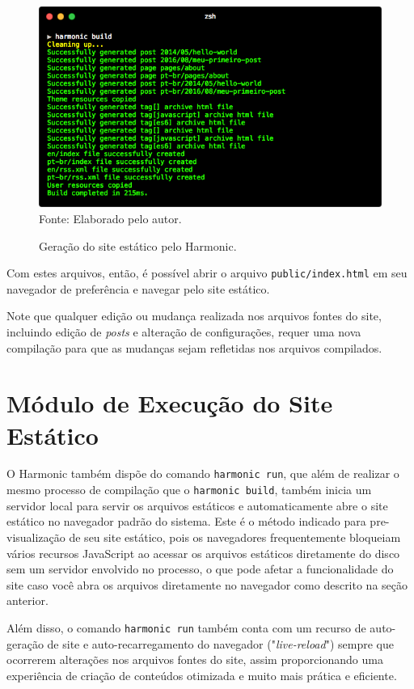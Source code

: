 \documentclass[ppginf, pep]{esinucpel}
\newcommand{\code}[1]{\texttt{#1}}
\begin{document}
\begin{figure}[htbp]
    \centering
    \caption{Geração do site estático pelo Harmonic.}
    \vspace{5pt}
    \includegraphics[width=\textwidth]{harmonic_build}
    \\Fonte: Elaborado pelo autor.
    \label{fig:comando_harmonic_build}
\end{figure}

Com estes arquivos, então, é possível abrir o arquivo \code{public/index.html} em seu navegador de preferência e navegar pelo site estático.

Note que qualquer edição ou mudança realizada nos arquivos fontes do site, incluindo edição de \textit{posts} e alteração de configurações, requer uma nova compilação para que as mudanças sejam refletidas nos arquivos compilados.

\section{Módulo de Execução do Site Estático}

O Harmonic também dispõe do comando \code{harmonic run}, que além de realizar o mesmo processo de compilação que o \code{harmonic build}, também inicia um servidor local para servir os arquivos estáticos e automaticamente abre o site estático no navegador padrão do sistema. Este é o método indicado para pre-visualização de seu site estático, pois os navegadores frequentemente bloqueiam vários recursos JavaScript ao acessar os arquivos estáticos diretamente do disco sem um servidor envolvido no processo, o que pode afetar a funcionalidade do site caso você abra os arquivos diretamente no navegador como descrito na seção anterior.

Além disso, o comando \code{harmonic run} também conta com um recurso de auto-geração de site e auto-recarregamento do navegador ("\textit{live-reload}") sempre que ocorrerem alterações nos arquivos fontes do site, assim proporcionando uma experiência de criação de conteúdos otimizada e muito mais prática e eficiente.
\end{document}
